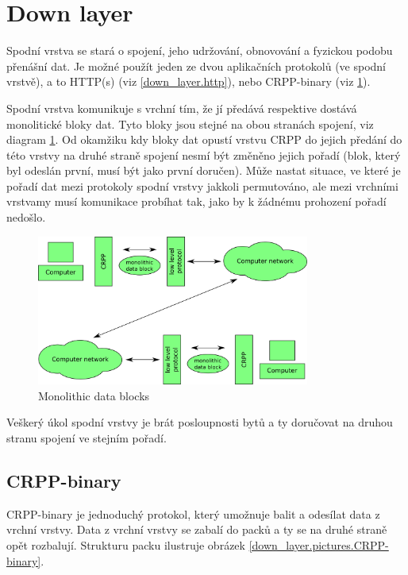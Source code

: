 \part{Down layer}
\label{down_layer}

Spodní vrstva se stará o spojení, jeho udržování, obnovování a fyzickou podobu přenášní dat. Je možné použít jeden ze dvou aplikačních protokolů (ve spodní vrstvě), a to HTTP(s) (viz \ref{down_layer.http}), nebo CRPP-binary (viz \ref{down_layer.crpp-binary}).

Spodní vrstva komunikuje s vrchní tím, že jí předává respektive dostává monolitické bloky dat. Tyto bloky jsou stejné na obou stranách spojení, viz diagram \ref{down_layer.pictures.monolithic_data_blocks}. Od okamžiku kdy bloky dat opustí vrstvu CRPP do jejich předání do této vrstvy na druhé straně spojení nesmí být změněno jejich pořadí (blok, který byl odeslán první, musí být jako první doručen). Může nastat situace, ve které je pořadí dat mezi protokoly spodní vrstvy jakkoli permutováno, ale mezi vrchními vrstvamy musí komunikace probíhat tak, jako by k žádnému prohození pořadí nedošlo.

\begin{figure}[h]
  \centering
  \includegraphics[width=0.80\textwidth]{diagrams/monolithic_data_blocks.png}
  \caption{Monolithic data blocks}
  \label{down_layer.pictures.monolithic_data_blocks}
\end{figure}

Veškerý úkol spodní vrstvy je brát posloupnosti bytů a ty doručovat na druhou stranu spojení ve stejním pořadí.

\chapter{CRPP-binary}
\label{down_layer.crpp-binary}

CRPP-binary je jednoduchý protokol, který umožnuje balit a odesílat data z vrchní vrstvy. Data z vrchní vrstvy se zabalí do packů a ty se na druhé straně opět rozbalují. Strukturu packu ilustruje obrázek \ref{down_layer.pictures.CRPP-binary}.

